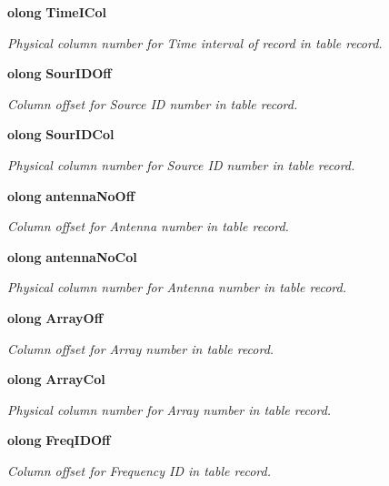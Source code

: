 \begin{CompactItemize}
{\bf olong} {\bf Time\-ICol}
\begin{CompactList}\small\item\em Physical column number for Time interval of record in table record. \item\end{CompactList}\item 
{\bf olong} {\bf Sour\-IDOff}
\begin{CompactList}\small\item\em Column offset for Source ID number in table record. \item\end{CompactList}\item 
{\bf olong} {\bf Sour\-IDCol}
\begin{CompactList}\small\item\em Physical column number for Source ID number in table record. \item\end{CompactList}\item 
{\bf olong} {\bf antenna\-No\-Off}
\begin{CompactList}\small\item\em Column offset for Antenna number in table record. \item\end{CompactList}\item 
{\bf olong} {\bf antenna\-No\-Col}
\begin{CompactList}\small\item\em Physical column number for Antenna number in table record. \item\end{CompactList}\item 
{\bf olong} {\bf Array\-Off}
\begin{CompactList}\small\item\em Column offset for Array number in table record. \item\end{CompactList}\item 
{\bf olong} {\bf Array\-Col}
\begin{CompactList}\small\item\em Physical column number for Array number in table record. \item\end{CompactList}\item 
{\bf olong} {\bf Freq\-IDOff}
\begin{CompactList}\small\item\em Column offset for Frequency ID in table record. \item\end{CompactList}\item 

\end{CompactItemize}
